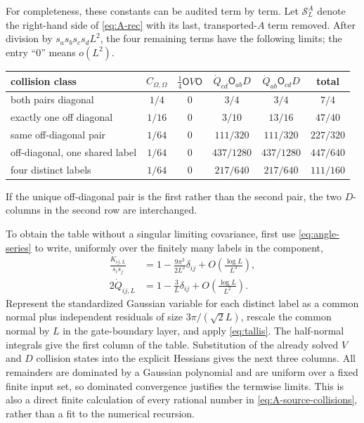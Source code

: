 \documentclass{article}
\begin{document}
For completeness, these constants can be audited term by term.  Let
\(\mathcal S^A_L\) denote the right-hand side of \eqref{eq:A-rec} with its
last, transported-\(A\) term removed.  After division by
\(s_as_bs_cs_dL^2\), the four remaining terms have the following limits; the
entry ``0'' means \(o(L^2)\).
\begin{center}
\scriptsize
\setlength{\tabcolsep}{4pt}
\begin{tabular}{lccccc}
\toprule
collision class&\(C_{\Omega,\Omega}\)&\(\frac14\mathsf O V\mathsf O\)&
\(\dot Q_{cd}\mathsf O_{ab}D\)&\(\dot Q_{ab}\mathsf O_{cd}D\)&total\\
\midrule
both pairs diagonal&\(1/4\)&0&\(3/4\)&\(3/4\)&\(7/4\)\\
exactly one off diagonal&\(1/16\)&0&\(3/10\)&\(13/16\)&\(47/40\)\\
same off-diagonal pair&\(1/64\)&0&\(111/320\)&\(111/320\)&\(227/320\)\\
off-diagonal, one shared label&\(1/64\)&0&\(437/1280\)&\(437/1280\)&\(447/640\)\\
four distinct labels&\(1/64\)&0&\(217/640\)&\(217/640\)&\(111/160\)\\
\bottomrule
\end{tabular}
\end{center}
If the unique off-diagonal pair is the first rather than the second pair,
the two \(D\)-columns in the second row are interchanged.

To obtain the table without a singular limiting covariance, first use
\eqref{eq:angle-series} to write, uniformly over the finitely many labels in
the component,
\begin{align}
\frac{K_{ij,L}}{s_is_j}
&=1-\frac{9\pi^2}{2L^2}\delta_{ij}
+O\!\left(\frac{\log L}{L^3}\right),\label{eq:collision-K}\\
2\dot Q_{ij,L}
&=1-\frac{3}{L}\delta_{ij}
+O\!\left(\frac{\log L}{L^2}\right).\label{eq:collision-gate}
\end{align}
Represent the standardized Gaussian variable for each distinct label as a
common normal plus independent residuals of size \(3\pi/(\sqrt2L)\), rescale the common normal
by \(L\) in the gate-boundary layer, and apply \eqref{eq:tallis}.  The
half-normal integrals give the first column of the table.  Substitution of
the already solved \(V\) and \(D\) collision states into the explicit
Hessians gives the next three columns.  All remainders are dominated by a
Gaussian polynomial and are uniform over a fixed finite input set, so
dominated convergence justifies the termwise limits.  This is also a direct
finite calculation of every rational number in
\eqref{eq:A-source-collisions}, rather than a fit to the numerical recursion.
\end{document}
